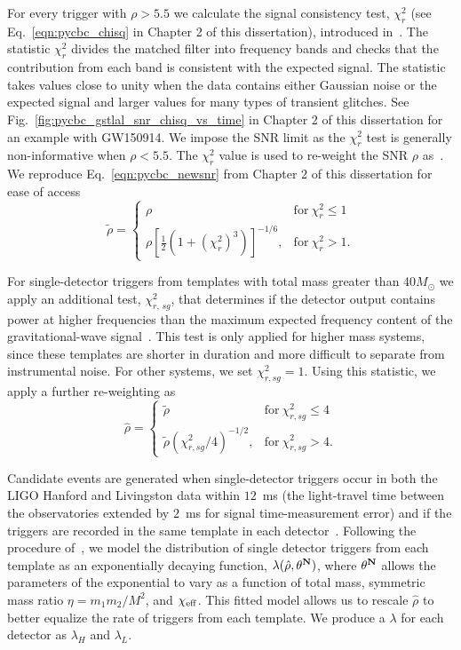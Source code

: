  For every trigger with $\rho > 5.5$ we calculate the signal consistency test, $\chi^2_r$ (see Eq.~\ref{eqn:pycbc_chisq} in Chapter 2 of this dissertation), introduced in~\cite{Allen:2004gu}. The statistic $\chi^2_r$ divides the matched filter into frequency bands and checks that the contribution from each band is consistent with the expected signal. The statistic takes values close to unity when the data contains either Gaussian noise or the expected signal and larger values for many types of transient glitches. See Fig.~\ref{fig:pycbc_gstlal_snr_chisq_vs_time} in Chapter 2 of this dissertation for an example with GW150914. We impose the SNR limit as the $\chi^2_r$ test is generally non-informative when $\rho < 5.5$. The $\chi^2_r$ value is used to re-weight the SNR $\rho$ as~\citep{Colaboration:2011np, Babak:2012zx}. We reproduce Eq.~\ref{eqn:pycbc_newsnr} from Chapter 2 of this dissertation for ease of access
%
\begin{equation}
 \tilde{\rho} = \begin{cases} 
        \rho & \mathrm{for}\ \chi^2_r \leq 1 \\
        \rho\left[ \frac{1}{2} \left(1 + \left(\chi^2_r\right)^3\right)\right]^{-1/6}, & 
        \mathrm{for}\ \chi^2_r > 1.
    \end{cases}
\end{equation}
%

For single-detector triggers from templates with total mass greater than 40$M_{\odot}$ we apply an additional test, $\chi^2_{r, \,sg}$, that determines if the detector output contains power at higher frequencies than the maximum expected frequency content of the gravitational-wave signal~\citep{Nitz:2017lco}. This test is only applied for higher mass systems, since these templates are shorter in duration and more difficult to separate from instrumental noise. For other systems, we set $\chi^2_{r,sg} = 1$. Using this statistic, we apply a further re-weighting as
%
\begin{equation}
\label{eq:sg}
 \hat{\rho} = \begin{cases} 
        \tilde{\rho} & \mathrm{for}\ \chi^2_{r,sg} \leq 4 \\
        \tilde{\rho} (\chi^2_{r,sg} / 4)^{-1/2}, & 
        \mathrm{for}\ \chi^2_{r,sg} > 4.
    \end{cases}
\end{equation}

Candidate events are generated when single-detector triggers occur in both the LIGO Hanford and Livingston data within $12$~ms (the light-travel time between the observatories extended by $2$~ms for signal time-measurement error) and if the triggers are recorded in the same template in each detector~\citep{Usman:2015kfa}.  Following the procedure of~\cite{Nitz:2017svb}, we model the distribution of single detector triggers from each template as an exponentially decaying function, $\lambda(\hat{\rho}, \bf{\theta}^N)$, where $\bf{\theta}^N$ allows the parameters of the exponential to vary as a function of total mass, symmetric mass ratio $\eta=m_1m_2/M^2$, and $\chi_{\mathrm{eff}}$. This fitted model allows us to rescale $\hat{\rho}$ to better equalize the rate of triggers from each template. We produce a $\lambda$ for each detector as $\lambda_{H}$ and $\lambda_{L}$.

